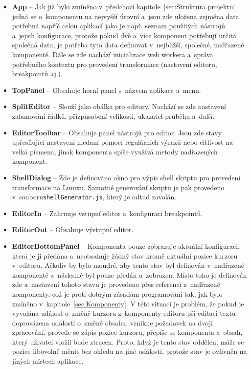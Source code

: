 \begin{itemize}
    \item \textbf{App} -- Jak již bylo zmíněno v~předchozí kapitole~\ref{sec:Struktura projektu} jedná se o~komponentu na nejvyšší úrovní a~jsou zde uložena zejména data potřebná napříč celou aplikací jako je např. seznam použitých nástrojů a~jejich konfigurace, protože pokud dvě a~více komponent potřebují určitá společná data, je potřeba tyto data definovat v~nejbližší, společné, nadřazené komponentě. Dále se zde nachází inicializace web workera a~správa potřebného kontextu pro provedení transformace (nastavení editoru, breakpointů aj.).
    \item \textbf{TopPanel} -- Obsahuje horní panel s~názvem aplikace a~menu.
    \item \textbf{SplitEditor} -- Slouží jako obálka pro editory. Nachází se zde nastavení zalamování řádků, přizpůsobení velikosti, ukazatel průběhu a~další.
    \item \textbf{EditorToolbar} -- Obsahuje panel nástrojů pro editor. Jsou zde stavy upřesňující nastavení hledaní pomocí regulárních výrazů nebo citlivost na velká písmena, jinak komponenta spíše využívá metody nadřazených komponent.
    \item \textbf{ShellDialog} -- Zde je definováno okno pro výpis shell skriptu pro provedení transformace na Linuxu. Samotné generování skriptu je pak provedeno v~souboru\newline \texttt{shellGenerator.js}, který je odtud zavolán.
    \item \textbf{EditorIn} -- Zahrnuje vstupní editor a~konfiguraci breakpointů.
    \item \textbf{EditorOut} -- Obsahuje výstupní editor. 
    \item \textbf{EditorBottomPanel} -- Komponenta pouze zobrazuje aktuální konfiguraci, která je ji předána a~neobsahuje žádný stav kromě aktuální pozice kurzoru v~editoru. Ačkoliv by bylo moudré, aby tento stav byl definován v~nadřazené komponentě a~následně byl pouze předán a~zobrazen. Místo toho je definován zde a~nastavení tohoto stavu je provedeno přes referenci z~nadřazené komponenty, což je proti dobrým zásadám programování tak, jak bylo zmíněno v~kapitole~\ref{sec:Komponenty}. V této situaci je problém, že pokud je vyvolána událost o~změně kurzoru z~komponenty editoru při editaci textu doprovázena událostí o~změně obsahu, vznikne požadavek na dvojí zpracování, provede se zápis pozice kurzoru, přepíše se komponenta a~obsah, který uživatel vložil bude ztracen. Proto, když je tento stav oddělen, může se pozice libovolně měnit bez ohledu na jiné události, protože stav je ovlivněn na jiných místech aplikace.

\end{itemize}
